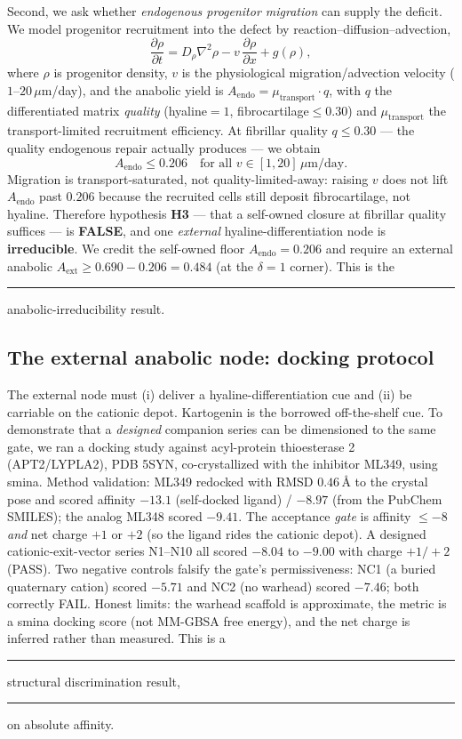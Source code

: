\documentclass[11pt,a4paper]{article}
\newcommand{\tierdisc}[1]{\textcolor{#1}{\rule[0.05ex]{1.0ex}{1.0ex}}}
\newcommand{\tierGreen}{\tierdisc{green!60!black}} %
\newcommand{\tierOrange}{\tierdisc{orange!90!black}} %
\begin{document}
Second, we ask whether \emph{endogenous progenitor migration} can supply the
deficit. We model progenitor recruitment into the defect by
reaction--diffusion--advection,
\begin{equation}
  \frac{\partial \rho}{\partial t}
  = D_\rho \nabla^2 \rho - v\,\frac{\partial \rho}{\partial x}
   + g(\rho) ,
\end{equation}
where $\rho$ is progenitor density, $v$ is the physiological migration/advection
velocity ($1$--$20\,\mu$m/day), and the anabolic yield is
$A_{\mathrm{endo}} = \mu_{\mathrm{transport}}\cdot q$, with $q$ the differentiated
matrix \emph{quality} (hyaline$=1$, fibrocartilage$\le0.30$) and
$\mu_{\mathrm{transport}}$ the transport-limited recruitment efficiency. At
fibrillar quality $q\le0.30$ --- the quality endogenous repair actually
produces --- we obtain
\begin{equation}
  A_{\mathrm{endo}} \le 0.206 \quad \text{for all } v\in[1,20]\,\mu\text{m/day}.
  \label{eq:aendo}
\end{equation}
Migration is transport-saturated, not quality-limited-away: raising $v$ does not
lift $A_{\mathrm{endo}}$ past $0.206$ because the recruited cells still deposit
fibrocartilage, not hyaline. Therefore hypothesis \textbf{H3} --- that a
self-owned closure at fibrillar quality suffices --- is \textbf{FALSE}, and one
\emph{external} hyaline-differentiation node is \textbf{irreducible}. We credit
the self-owned floor $A_{\mathrm{endo}}=0.206$ and require an external anabolic
$A_{\mathrm{ext}} \ge 0.690-0.206 = 0.484$ (at the $\delta=1$ corner). This is the
\tierGreen{} anabolic-irreducibility result.

\subsection{The external anabolic node: docking protocol}
\label{sec:docking}

The external node must (i) deliver a hyaline-differentiation cue and (ii) be
carriable on the cationic depot. Kartogenin is the borrowed off-the-shelf cue. To
demonstrate that a \emph{designed} companion series can be dimensioned to the same
gate, we ran a docking study against acyl-protein thioesterase 2 (APT2/LYPLA2),
PDB 5SYN, co-crystallized with the inhibitor ML349, using smina. Method
validation: ML349 redocked with RMSD $0.46$\,\AA{} to the crystal pose and scored
affinity $-13.1$ (self-docked ligand) / $-8.97$ (from the PubChem SMILES);
the analog ML348 scored $-9.41$. The acceptance \emph{gate} is affinity
$\le-8$ \emph{and} net charge $+1$ or $+2$ (so the ligand rides the cationic
depot). A designed cationic-exit-vector series N1--N10 all scored $-8.04$ to
$-9.00$ with charge $+1/+2$ (PASS). Two negative controls falsify the gate's
permissiveness: NC1 (a buried quaternary cation) scored $-5.71$ and NC2 (no
warhead) scored $-7.46$; both correctly FAIL. Honest limits: the warhead scaffold
is approximate, the metric is a smina docking score (not MM-GBSA free energy), and
the net charge is inferred rather than measured. This is a \tierGreen{}
structural discrimination result, \tierOrange{} on absolute affinity.
\end{document}
